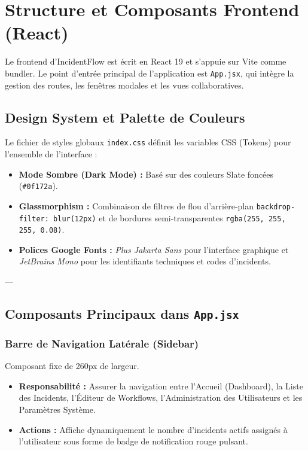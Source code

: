 \documentclass[12pt,a4paper]{article}
\begin{document}
\section{Structure et Composants Frontend (React)}

Le frontend d'IncidentFlow est écrit en React 19 et s'appuie sur Vite comme bundler. Le point d'entrée principal de l'application est \texttt{App.jsx}, qui intègre la gestion des routes, les fenêtres modales et les vues collaboratives.

\subsection{Design System et Palette de Couleurs}
Le fichier de styles globaux \texttt{index.css} définit les variables CSS (Tokens) pour l'ensemble de l'interface :
\begin{itemize}
    \item \textbf{Mode Sombre (Dark Mode) :} Basé sur des couleurs Slate foncées (\texttt{\#0f172a}).
    \item \textbf{Glassmorphism :} Combinaison de filtres de flou d'arrière-plan \texttt{backdrop-filter: blur(12px)} et de bordures semi-transparentes \texttt{rgba(255, 255, 255, 0.08)}.
    \item \textbf{Polices Google Fonts :} \textit{Plus Jakarta Sans} pour l'interface graphique et \textit{JetBrains Mono} pour les identifiants techniques et codes d'incidents.
\end{itemize}

---

\subsection{Composants Principaux dans \texttt{App.jsx}}

\subsubsection{Barre de Navigation Latérale (Sidebar)}
Composant fixe de 260px de largeur.
\begin{itemize}
    \item \textbf{Responsabilité :} Assurer la navigation entre l'Accueil (Dashboard), la Liste des Incidents, l'Éditeur de Workflows, l'Administration des Utilisateurs et les Paramètres Système.
    \item \textbf{Actions :} Affiche dynamiquement le nombre d'incidents actifs assignés à l'utilisateur sous forme de badge de notification rouge pulsant.
\end{itemize}
\end{document}
